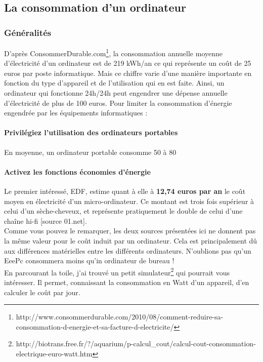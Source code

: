 \documentclass[a4paper,11pt,french]{article}
\begin{document}
\subsection{La consommation d'un ordinateur}

\subsubsection{Généralités}
D'après ConsommerDurable.com\footnote{\textsf{http://www.consommerdurable.com/2010/08/comment-reduire-sa-consommation-d-energie-et-sa-facture-d-electricite/}}, la consommation annuelle moyenne d’électricité d’un ordinateur est de 219 kWh/an ce qui représente un coût de 25 euros par poste informatique. Mais ce chiffre varie d’une manière importante en fonction du type d’appareil et de l’utilisation qui en est faite. Ainsi, un ordinateur qui fonctionne 24h/24h peut engendrer une dépense annuelle d’électricité de plus de 100 euros. Pour limiter la consommation d’énergie engendrée par les équipements informatiques :

\paragraph{Privilégiez l’utilisation des ordinateurs portables}
En moyenne, un ordinateur portable consomme 50 à 80%

\paragraph{Activez les fonctions \og économies d’énergie \fg}
Le premier intéressé, EDF, estime quant à elle à \textbf{12,74 euros par an} le coût moyen en électricité d'un micro-ordinateur. Ce montant est trois fois supérieur à celui d'un sèche-cheveux, et représente pratiquement le double de celui d'une chaîne hi-fi [source 01.net].\\

Comme vous pouvez le remarquer, les deux sources présentées ici ne donnent pas la même valeur pour le coût induit par un ordinateur. Cela est principalement dû aux différences matérielles entre les différents ordinateurs. N'oublions pas qu'un EeePc consommera moins qu'in ordinateur de bureau !\\

En parcourant la toile, j'ai trouvé un petit simulateur\footnote{\textsf{http://biotrans.free.fr/?/aquarium/p-calcul\_{}cout/calcul-cout-consommation-electrique-euro-watt.htm}} qui pourrait vous intéresser. Il permet, connaissant la consommation en Watt d'un appareil, d'en calculer le coût par jour.\\
\end{document}
